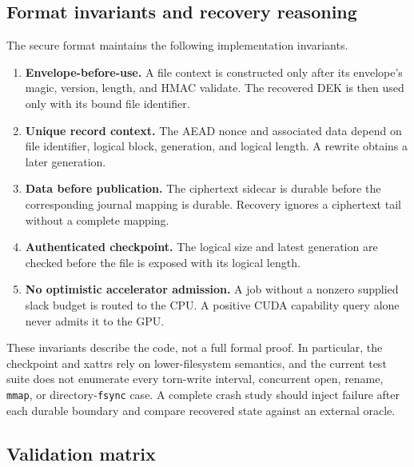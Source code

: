 \subsection{Format invariants and recovery reasoning}

The secure format maintains the following implementation invariants.
\begin{enumerate}
  \item \textbf{Envelope-before-use.} A file context is constructed only after its envelope's magic, version, length, and HMAC validate.  The recovered DEK is then used only with its bound file identifier.
  \item \textbf{Unique record context.} The AEAD nonce and associated data depend on file identifier, logical block, generation, and logical length.  A rewrite obtains a later generation.
  \item \textbf{Data before publication.} The ciphertext sidecar is durable before the corresponding journal mapping is durable.  Recovery ignores a ciphertext tail without a complete mapping.
  \item \textbf{Authenticated checkpoint.} The logical size and latest generation are checked before the file is exposed with its logical length.
  \item \textbf{No optimistic accelerator admission.} A job without a nonzero supplied slack budget is routed to the CPU.  A positive CUDA capability query alone never admits it to the GPU.
\end{enumerate}

These invariants describe the code, not a full formal proof.  In particular, the checkpoint and xattrs rely on lower-filesystem semantics, and the current test suite does not enumerate every torn-write interval, concurrent open, rename, \texttt{mmap}, or directory-\texttt{fsync} case.  A complete crash study should inject failure after each durable boundary and compare recovered state against an external oracle.

\subsection{Validation matrix}
\label{sec:app_batch_size}

